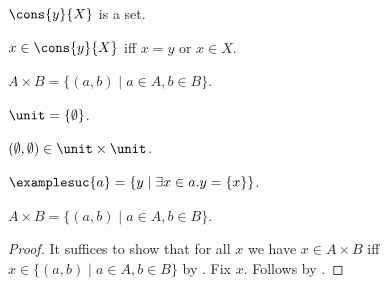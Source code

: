 \begin{signature}\label{example_cons}
    $\cons{y}{X}$ is a set.
\end{signature}

\begin{axiom}\label{cons}
    $x\in \cons{y}{X}$ iff $x = y$ or $x\in X$.
\end{axiom}

\begin{definition}\label{times}
    $A\times B = \{ (a,b) \mid a\in A, b\in B\}$.
\end{definition}

\begin{definition}\label{unit}
    $\unit = \{\emptyset\}$.
\end{definition}

\begin{proposition}\label{pair_emptyset_in_times_unit}
    $(\emptyset,\emptyset)\in \unit\times\unit$.
\end{proposition}


\begin{definition}\label{example_suc}
    $\examplesuc{a} = \{ y \mid \exists x\in a. y = \{x\} \}$.
\end{definition}


\begin{proposition}\label{times_replacement_test}
    $A\times B = \{ (a,b) \mid a\in A, b\in B\}$.
\end{proposition}
\begin{proof}
    It suffices to show that for all $x$ we have
        $x\in A\times B$ iff
        $x\in \{ (a,b) \mid a\in A, b\in B\}$
        by .
    Fix $x$.
    Follows by .
\end{proof}
